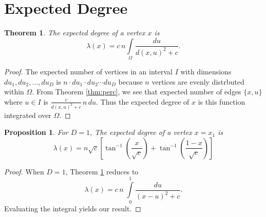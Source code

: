 \documentclass[a4paper,10pt]{article}
\newtheorem{prop}{Proposition}
\newtheorem{theorem}{Theorem}
\begin{document}
\section{Expected Degree}
\begin{theorem}
\label{thm:lambdax}
The expected degree of a vertex $x$ is
 \begin{equation}
 \lambda(x) = c\,n\int\limits_\Omega \frac{du}{d(x, u)^2 + c}.
\end{equation}
\end{theorem}
\begin{proof}
The expected number of vertices in an interval $I$ with dimensions $du_1, du_2, \ldots, du_D$  is $n \cdot du_1 \cdot du_2 \cdots du_D$ because $n$ vertices are evenly distrbuted within $\Omega$. From Theorem \ref{thm:perc}, we see that expected number of edges $\{x, u\}$ where $u \in I$ is $\frac{c}{d(x, u)^2 + c} \, n \, du$. Thus the expected degree of $x$ is this function integrated over $\Omega$.
\end{proof}

\begin{prop}
\label{prop:lambdax1}
For $D = 1$, The expected degree of a vertex $x = x_1$ is
 \begin{equation}
 \lambda(x) = n\sqrt{c}\left[\tan^{-1}\left(\frac{x}{\sqrt{c}}\right)+\tan^{-1}\left(\frac{1-x}{\sqrt{c}}\right)\right]
\end{equation}
\end{prop}
\begin{proof}
When $D=1$, Theorem \ref{thm:lambdax} reduces to
\begin{equation}
 \lambda(x) = c\,n\;\int\limits_{0}^{1} \frac{du}{(x - u)^2 + c}.
\end{equation}
Evaluating the integral yields our result.
\end{proof}
\end{document}
